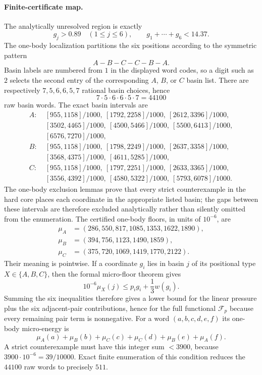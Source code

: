 \documentclass[11pt]{article}
\begin{document}
\paragraph{Finite-certificate map.}
The analytically unresolved region is exactly
\[
 g_j>0.89\quad(1\le j\le6),
 \qquad
 g_1+\cdots+g_6<14.37.
\]
The one-body localization partitions the six positions according to the
symmetric pattern
\[
 A-B-C-C-B-A.
\]
Basin labels are numbered from $1$ in the displayed word codes, so a digit
such as $2$ selects the second entry of the corresponding $A$, $B$, or $C$
basin list.  There are respectively $7,5,6,6,5,7$ rational basin choices,
hence
\[
 7\cdot5\cdot6\cdot6\cdot5\cdot7=44100
\]
raw basin words.  The exact basin intervals are
\begin{align*}
 A:\;&[955,1158]/1000,\ [1792,2258]/1000,\ [2612,3396]/1000,\\
    & [3502,4465]/1000,\ [4500,5466]/1000,\ [5500,6413]/1000,\\
    & [6576,7270]/1000,\\[1mm]
 B:\;&[955,1158]/1000,\ [1798,2249]/1000,\ [2637,3358]/1000,\\
    & [3568,4375]/1000,\ [4611,5285]/1000,\\[1mm]
 C:\;&[955,1158]/1000,\ [1797,2251]/1000,\ [2633,3365]/1000,\\
    & [3556,4392]/1000,\ [4580,5322]/1000,\ [5793,6078]/1000.
\end{align*}
The one-body exclusion lemmas prove that every strict counterexample in the
hard core places each coordinate in the appropriate listed basin; the gaps
between these intervals are therefore excluded analytically rather than
silently omitted from the enumeration.  The certified one-body floors, in
units of $10^{-6}$, are
\[
\begin{aligned}
 \mu_A&=(286,550,817,1085,1353,1622,1890),\\
 \mu_B&=(394,756,1123,1490,1859),\\
 \mu_C&=(375,720,1069,1419,1770,2122).
\end{aligned}
\]
Their meaning is pointwise.  If a coordinate $g_i$ lies in basin $j$ of its
positional type $X\in\{A,B,C\}$, then the formal micro-floor theorem gives
\[
 10^{-6}\mu_X(j)
 \le p_i g_i+\frac13 w(g_i).
\]
Summing the six inequalities therefore gives a lower bound for the linear
pressure plus the six adjacent-pair contributions, hence for the full
functional $\mathcal F_p$ because every remaining pair term is nonnegative.
For a word $(a,b,c,d,e,f)$ its one-body micro-energy is
\[
 \mu_A(a)+\mu_B(b)+\mu_C(c)+\mu_C(d)+\mu_B(e)+\mu_A(f).
\]
A strict counterexample must have this integer sum $<3900$, because
$3900\cdot10^{-6}=39/10000$.  Exact finite enumeration of this condition
reduces the $44100$ raw words to precisely $511$.
\end{document}
